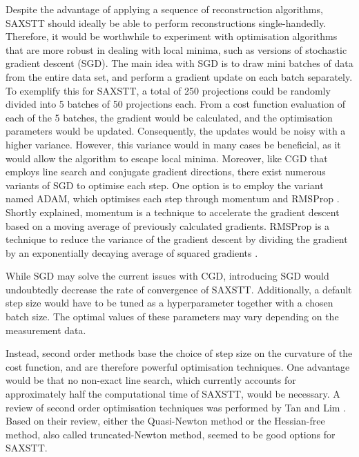 Despite the advantage of applying a sequence of reconstruction algorithms, SAXSTT should ideally be able to perform reconstructions single-handedly.
Therefore, it would be worthwhile to experiment with optimisation algorithms that are more robust in dealing with local minima, such as versions of stochastic gradient descent (SGD).
The main idea with SGD is to draw mini batches of data from the entire data set, and perform a gradient update on each batch separately.
To exemplify this for SAXSTT, a total of 250 projections could be randomly divided into 5 batches of 50 projections each.
From a cost function evaluation of each of the 5 batches, the gradient would be calculated, and the optimisation parameters would be updated.
Consequently, the updates would be noisy with a higher variance. However, this variance would in many cases be beneficial,
as it would allow the algorithm to escape local minima.
Moreover, like CGD that employs line search and conjugate gradient directions, there exist numerous variants of SGD to optimise each step.
One option is to employ the variant named ADAM, which optimises each step through momentum and RMSProp \cite{Goodfellow-et-al-2016}.
Shortly explained, momentum is a technique to accelerate the gradient descent based on a moving average of previously calculated gradients.
RMSProp is a technique to reduce the variance of the gradient descent by dividing the gradient by an exponentially decaying average of squared gradients \cite{Goodfellow-et-al-2016}.

While SGD may solve the current issues with CGD, introducing SGD would undoubtedly decrease the rate of convergence of SAXSTT.
Additionally, a default step size would have to be tuned as a hyperparameter together with a chosen batch size.
The optimal values of these parameters may vary depending on the measurement data.

Instead, second order methods base the choice of step size on the curvature of the cost function, and are therefore powerful optimisation techniques.
One advantage would be that no non-exact line search, which currently accounts for approximately half the computational time of SAXSTT, would be necessary.
A review of second order optimisation techniques was performed by Tan and Lim \cite{tan2019review}.
Based on their review, either the Quasi-Newton method or the Hessian-free method, also called truncated-Newton method, seemed to be good options for SAXSTT.

